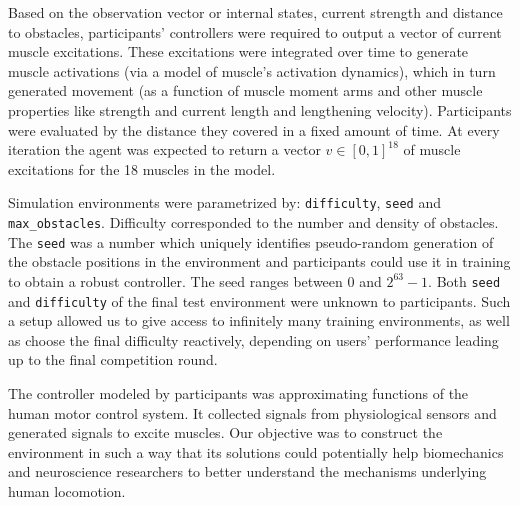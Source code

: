 \documentclass[graybox]{svmult}
\begin{document}
Based on the observation vector or internal states, current strength and distance to obstacles, participants' controllers were required to output a vector of current muscle excitations. These excitations were integrated over time to generate muscle activations (via a model of muscle's activation dynamics), which in turn generated movement (as a function of muscle moment arms and other muscle properties like strength and current length and lengthening velocity). Participants were evaluated by the distance they covered in a fixed amount of time. At every iteration the agent was expected to return a vector $v \in [0,1]^{18}$ of muscle excitations for the 18 muscles in the model.

Simulation environments were parametrized by: \verb|difficulty|, \verb|seed| and \verb|max_obstacles|. Difficulty corresponded to the number and density of obstacles. The \verb|seed| was a number which uniquely identifies pseudo-random generation of the obstacle positions in the environment and participants could use it in training to obtain a robust controller. The seed ranges between $0$ and $2^{63} - 1$. Both \verb|seed| and \verb|difficulty| of the final test environment were unknown to participants. Such a setup allowed us to give access to infinitely many training environments, as well as choose the final difficulty reactively, depending on users' performance leading up to the final competition round.

The controller modeled by participants was approximating functions of the human motor control system. It collected signals from physiological sensors and generated signals to excite muscles. Our objective was to construct the environment in such a way that its solutions could potentially help biomechanics and neuroscience researchers to better understand the mechanisms underlying human locomotion.

\end{document}
